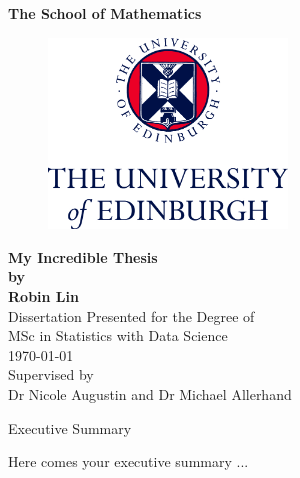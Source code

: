 \documentclass[11pt,twoside]{article}
\numberwithin{Theorem}{section}
\numberwithin{Definition}{section}
\numberwithin{Lemma}{section}
\numberwithin{Algorithm}{section}
\numberwithin{equation}{section}
\begin{document}
\pagestyle{empty}

\begin{titlepage}
\vspace*{.5em}
\center
\textbf{\Large{The School of Mathematics}} \\
\vspace*{1em}
\begin{figure}[!h]
\centering
\includegraphics[width=180pt]{CentredLogoCMYK.jpg}
\end{figure}
\vspace{2em}
\textbf{\Huge{My Incredible Thesis}}\\[2em]
\textbf{\LARGE{by}}\\
\vspace{2em}
\textbf{\LARGE{Robin Lin}}\\
\vspace{6.5em}
\Large{Dissertation Presented for the Degree of\\
MSc in Statistics with Data Science}\\
\vspace{6.5em}
\Large{\today}\\
\vspace{3em}
\Large{Supervised by\\Dr Nicole Augustin and Dr Michael Allerhand}
\vfill
\end{titlepage}

\cleardoublepage

\begin{center}
\Large{Executive Summary}
\end{center}

Here comes your executive summary ...
\end{document}
